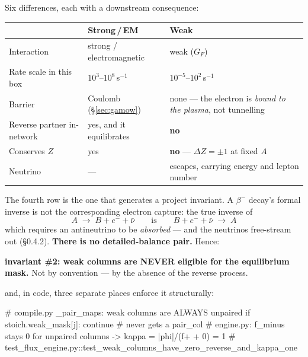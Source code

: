 Six differences, each with a downstream consequence:

\begin{center}
\begin{tabularx}{\textwidth}{@{}L{3.4cm} L{4.0cm} Y@{}}
\toprule
 & \textbf{Strong\,/\,EM} & \textbf{Weak} \\
\midrule
Interaction & strong / electromagnetic & weak ($G_F$) \\
Rate scale in this box & $10^3$--$10^8$\,s$^{-1}$ &
  $10^{-5}$--$10^{2}$\,s$^{-1}$ \\
Barrier & Coulomb (\S\ref{sec:gamow}) &
  none --- the electron is \emph{bound to the plasma}, not tunnelling \\
Reverse partner in-network & yes, and it equilibrates & \textbf{no} \\
Conserves $Z$ & yes & \textbf{no} --- $\Delta Z = \pm1$ at fixed $A$ \\
Neutrino & --- & escapes, carrying energy and lepton number \\
\bottomrule
\end{tabularx}
\end{center}

The fourth row is the one that generates a project invariant. A $\beta^-$
decay's formal inverse is not the corresponding electron capture: the true
inverse of
%
\begin{equation*}
A \;\longrightarrow\; B + e^- + \bar\nu
\qquad\text{is}\qquad
B + e^- + \bar\nu \;\longrightarrow\; A
\end{equation*}
%
which requires an antineutrino to be \emph{absorbed} --- and the neutrinos
free-stream out (\S0.4.2). \textbf{There is no detailed-balance pair.} Hence:

\begin{invariant}
 \textbf{invariant \#2: weak columns are NEVER eligible for the
equilibrium mask.} Not by convention --- by the absence of the reverse process.
\end{invariant}

and, in code, three separate places enforce it structurally:

\begin{srclisting}
# compile.py _pair_maps: weak columns are ALWAYS unpaired
if stoich.weak_mask[j]: continue          # never gets a pair_col
# engine.py: f_minus stays 0 for unpaired columns -> kappa = |phi|/(f+ + 0) = 1
# test_flux_engine.py::test_weak_columns_have_zero_reverse_and_kappa_one
\end{srclisting}

